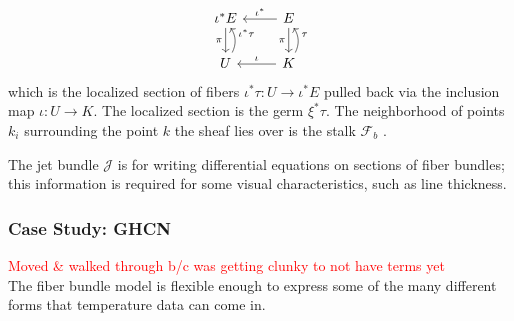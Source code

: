 \documentclass[../main.tex]{subfiles}
\begin{document}
\begin{equation}
    \label{eq:sheaf}
    \begin{tikzcd}
        \iota^*E \arrow[d, "\pi"']           & E \arrow[d, "\pi"'] \arrow[l, "\iota^*"']         \\
        U \arrow[u, "\iota^*\tau"', bend right] & K \arrow[u, "\tau"', bend right] \arrow[l, "\iota"']
        \end{tikzcd}
\end{equation}
which is the localized section of fibers $\iota^*\tau: U \rightarrow \iota^*E$ pulled back via the inclusion map $\iota: U \rightarrow K$. The localized section is the germ $\xi^*\tau$. The neighborhood of points $k_i$ surrounding the point $k$ the sheaf lies over is the stalk $\mathcal{F}_b$ \cite{StalkSheaf2019,spanier1989algebraic}.

The jet bundle $\mathcal{J}$ \cite{JetBundle2020,musilovaCalculusVariationsJet2016} is for writing differential equations on sections of fiber bundles; this information is required for some visual characteristics, such as line thickness. 

\subsubsection{Case Study: GHCN}
\textcolor{red}{Moved \& walked through b/c was getting clunky to not have terms yet}\\


The fiber bundle model is flexible enough to express some of the many different forms that temperature data can come in. 
\end{document}
